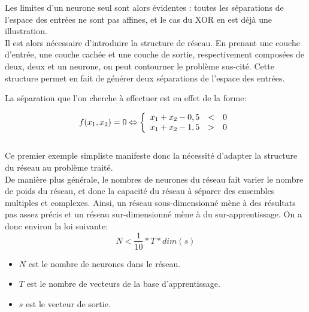 \documentclass[a4paper,oneside]{report}
\begin{document}
                Les limites d'un neurone seul sont alors évidentes : toutes les séparations de l'espace des entrées ne sont pas affines, et le cas du XOR en est déjà  une illustration.\\

                Il est alors nécessaire d'introduire la structure de réseau. En prenant une couche d'entrée, une couche cachée et une couche de sortie, respectivement composées de deux, deux et un neurone, on peut contourner le problème sus-cité. Cette structure permet en fait de générer deux séparations de l'espace des entrées.

                La séparation que l'on cherche à  effectuer est en effet de la forme:

                \begin{equation}
                    f(x_{1},x_{2})=0 \Leftrightarrow
                    \left\{
                        \begin{array}{r c l}
                        x_{1}+x_{2}-0,5 &<& 0\\
                        x_{1}+x_{2}-1,5 &>& 0
                        \end{array}
                    \right.
                \end{equation}\\

                Ce premier exemple simpliste manifeste donc la nécessité d'adapter la structure du réseau au problème traité.\\

                De manière plus générale, le nombres de neurones du réseau fait varier le nombre de poids du réseau, et donc la capacité du réseau à  séparer des ensembles multiples et complexes. Ainsi, un réseau sous-dimensionné mène à  des résultats pas assez précis et un réseau sur-dimensionné mène à  du sur-apprentissage. On a donc environ la loi suivante:
                \begin{equation}
                    N<\frac{1}{10}*T*dim(s)
                \end{equation}
                \begin{itemize}
                    \item $N$ est le nombre de neurones dans le réseau.
                    \item $T$ est le nombre de vecteurs de la base d'apprentissage.
                    \item $s$ est le vecteur de sortie.
                \end{itemize}
\end{document}
